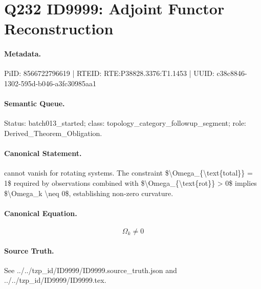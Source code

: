 \section*{Q232 ID9999: Adjoint Functor Reconstruction}
\paragraph{Metadata.}
PiID: 8566722796619 | RTEID: RTE:P38828.3376:T1.1453 | UUID: c38c8846-1302-595d-b046-a3fc30985aa1

\paragraph{Semantic Queue.}
Status: batch013\_started; class: topology\_category\_followup\_segment; role: Derived\_Theorem\_Obligation.

\paragraph{Canonical Statement.}
cannot vanish for rotating systems. The constraint \$\textbackslash{}Omega\_\{\textbackslash{}text\{total\}\} = 1\$ required by observations combined with \$\textbackslash{}Omega\_\{\textbackslash{}text\{rot\}\} > 0\$ implies \$\textbackslash{}Omega\_k \textbackslash{}neq 0\$, establishing non-zero curvature.

\paragraph{Canonical Equation.}
\[
\Omega_k \neq 0
\]

\paragraph{Source Truth.}
See ../../tzp\_id/ID9999/ID9999.source\_truth.json and ../../tzp\_id/ID9999/ID9999.tex.
